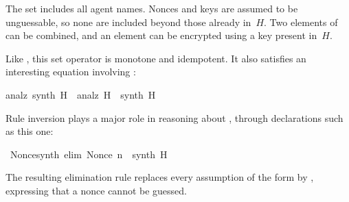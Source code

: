 \begin{isabellebody}
\isadelimproof
%
\endisadelimproof
%
\isatagproof
%
\endisatagproof
{\isafoldproof}%
%
\isadelimproof
%
\endisadelimproof
%
\isadelimproof
%
\endisadelimproof
%
\isatagproof
%
\endisatagproof
{\isafoldproof}%
%
\isadelimproof
%
\endisadelimproof
%
\isadelimproof
%
\endisadelimproof
%
\isatagproof
%
\endisatagproof
{\isafoldproof}%
%
\isadelimproof
%
\endisadelimproof
%
\begin{isamarkuptext}%
The set includes all agent names.  Nonces and keys are assumed to be
unguessable, so none are included beyond those already in~$H$.   Two
elements of  can be combined, and an element can be encrypted
using a key present in~$H$.

Like , this set operator is monotone and idempotent.  It also
satisfies an interesting equation involving :
\begin{isabelle}%
analz\ {}synth\ H{}\ {}\ analz\ H\ {}\ synth\ H%
\end{isabelle}
Rule inversion plays a major role in reasoning about , through
declarations such as this one:%
\end{isamarkuptext}%
\isamarkuptrue%
\isamarkupfalse%
\ Nonce{}synth\ {}elim{}{}{}\ {}Nonce\ n\ {}\ synth\ H{}%
\begin{isamarkuptext}%
\noindent
The resulting elimination rule replaces every assumption of the form
 by ,
expressing that a nonce cannot be guessed.  


\end{isamarkuptext}
\end{isabellebody}
